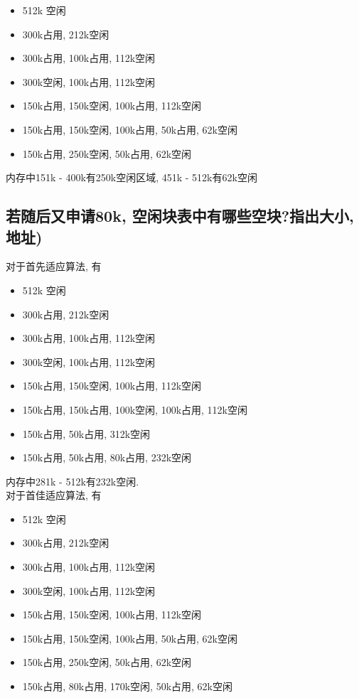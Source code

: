 \documentclass[a4paper, 12pt, notitlepage]{article}
\begin{document}
\begin{itemize}
	\item 512k 空闲
	\item 300k占用, 212k空闲
	\item 300k占用, 100k占用, 112k空闲
	\item 300k空闲, 100k占用, 112k空闲
	\item 150k占用, 150k空闲, 100k占用, 112k空闲
	\item 150k占用, 150k空闲, 100k占用, 50k占用, 62k空闲
	\item 150k占用, 250k空闲, 50k占用, 62k空闲
\end{itemize}

	内存中151k - 400k有250k空闲区域, 451k - 512k有62k空闲

\subsection{若随后又申请80k, 空闲块表中有哪些空块?指出大小, 地址)}

	对于首先适应算法, 有
	
\begin{itemize}
	\item 512k 空闲
	\item 300k占用, 212k空闲
	\item 300k占用, 100k占用, 112k空闲
	\item 300k空闲, 100k占用, 112k空闲
	\item 150k占用, 150k空闲, 100k占用, 112k空闲
	\item 150k占用, 150k占用, 100k空闲, 100k占用, 112k空闲
	\item 150k占用, 50k占用, 312k空闲
	\item 150k占用, 50k占用, 80k占用, 232k空闲
\end{itemize}

	内存中281k - 512k有232k空闲. \\
	
	对于首佳适应算法, 有
	
\begin{itemize}
	\item 512k 空闲
	\item 300k占用, 212k空闲
	\item 300k占用, 100k占用, 112k空闲
	\item 300k空闲, 100k占用, 112k空闲
	\item 150k占用, 150k空闲, 100k占用, 112k空闲
	\item 150k占用, 150k空闲, 100k占用, 50k占用, 62k空闲
	\item 150k占用, 250k空闲, 50k占用, 62k空闲
	\item 150k占用, 80k占用, 170k空闲, 50k占用, 62k空闲
\end{itemize}
\end{document}

